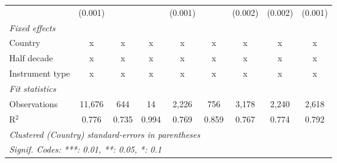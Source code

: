 \begin{table}[htbp]
\begin{tabular}{lcccccccc}
                                                                        & (0.001)        &                           &              & (0.001)        &                  & (0.002)         & (0.002)         & (0.001)\\   
      \emph{Fixed effects}\\
      Country                                                           & x              & x                         & x            & x              & x                & x               & x               & x\\  
      Half decade                                                       & x              & x                         & x            & x              & x                & x               & x               & x\\  
      Instrument type                                                   & x              & x                         & x            & x              & x                & x               & x               & x\\  
      \midrule \emph{Fit statistics}\\
      Observations                                                      & 11,676         & 644                       & 14           & 2,226          & 756              & 3,178           & 2,240           & 2,618\\  
      R$^2$                                                             & 0.776          & 0.735                     & 0.994        & 0.769          & 0.859            & 0.767           & 0.774           & 0.792\\  
      \midrule
      \multicolumn{9}{l}{\emph{Clustered (Country) standard-errors in parentheses}}\\
      \multicolumn{9}{l}{\emph{Signif. Codes: ***: 0.01, **: 0.05, *: 0.1}}\\
   \end{tabular}
\end{table}


